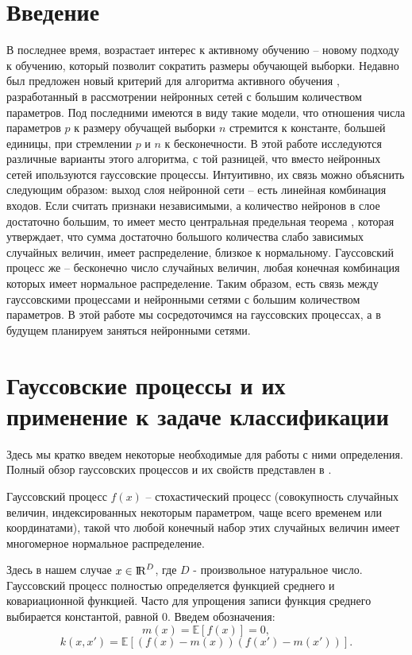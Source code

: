 \documentclass{llncs}
\begin{document}
\section{Введение}
В последнее время, возрастает интерес к активному обучению \cite{generalav} -- новому подходу к обучению, который позволит сократить размеры обучающей выборки. Недавно был предложен новый критерий для алгоритма активного обучения \cite{av}, разработанный в рассмотрении нейронных сетей с большим количеством параметров. Под последними имеются в виду такие модели, что отношения числа параметров $p$ к размеру обучащей выборки $n$ стремится к константе, большей единицы, при стремлении $p$ и $n$ к бесконечности. В этой работе исследуются различные варианты этого алгоритма, с той разницей, что вместо нейронных сетей ипользуются гауссовские процессы. Интуитивно, их связь можно объяснить следующим образом: выход слоя нейронной сети -- есть линейная комбинация входов. Если считать признаки независимыми, а количество нейронов в слое достаточно большим, то имеет место центральная предельная теорема \cite{teorver}, которая утверждает, что сумма достаточно большого количества слабо зависимых случайных величин, имеет распределение, близкое к нормальному. Гауссовский процесс же -- бесконечно число случайных величин, любая конечная комбинация которых имеет нормальное распределение. Таким образом, есть связь между гауссовскими процессами и нейронными сетями с большим количеством параметров. В этой работе мы сосредоточимся на гауссовских процессах, а в будущем планируем заняться нейронными сетями.
\section{Гауссовские процессы и их применение к задаче классификации}
Здесь мы кратко введем некоторые необходимые для работы с ними определения. Полный обзор гауссовских процессов и их свойств представлен в \cite{gp}.
\begin{defi}
Гауссовский процесс $f\left(x\right)$ -- стохастический процесс (совокупность случайных величин, индексированных некоторым параметром, чаще всего временем или координатами), такой что любой конечный набор этих случайных величин имеет многомерное нормальное распределение.
\end{defi}
Здесь в нашем случае $x \in {\rm I\!R}^D$, где $D$ - произвольное натуральное число.
Гауссовский процесс полностью определяется функцией среднего и ковариационной функцией. Часто для упрощения записи функция среднего выбирается константой, равной 0. Введем обозначения:
\begin{equation}
m\left(x\right) = \mathds{E}\left[ f\left(x\right) \right] = 0,
\end{equation}
\begin{equation}
k\left(x, x'\right) = \mathds{E} \left[ \left(f\left(x\right) - m\left(x\right)\right) \left(f\left(x'\right) - m\left(x'\right)\right)\right].
\end{equation}
\end{document}

